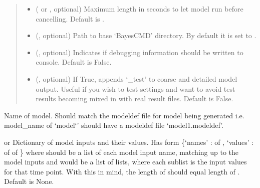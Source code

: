\documentclass[letterpaper,10pt,english]{sphinxmanual}
\begin{document}
\begin{fulllineitems}
\begin{quote}
\begin{description}
\begin{itemize}
\item {} 
 ( or , optional) \textendash{} Maximum length in seconds to let model run before cancelling. Default
is {\hyperref[\detokenize{bcmdModel:bayescmd.bcmdModel.bcmd_model.TIMEOUT}]{}}.

\item {} 
 (, optional) \textendash{} Path to base ‘BayesCMD’ directory. By default it is set to
{\hyperref[\detokenize{bcmdModel:bayescmd.bcmdModel.bcmd_model.BASEDIR}]{}}.

\item {} 
 (, optional) \textendash{} Indicates if debugging information should be written to console.
Default is False.

\item {} 
 (, optional) \textendash{} If True, appends ‘\_test’ to coarse and detailed model output. Useful
if you wish to test settings and want to avoid test results becoming
mixed in with real result files. Default is False.

\end{itemize}

\end{description}\end{quote}

\begin{fulllineitems}
\label{\detokenize{bcmdModel:bayescmd.bcmdModel.bcmd_model.ModelBCMD.model_name}}
 \textendash{} Name of model. Should match the modeldef file for model being generated
i.e. model\_name of ‘model{}`’ should have a modeldef file
‘model1.modeldef’.

\end{fulllineitems}


\begin{fulllineitems}
\label{\detokenize{bcmdModel:bayescmd.bcmdModel.bcmd_model.ModelBCMD.inputs}}
 or  \textendash{} Dictionary of model inputs and their values. Has form
\{‘names’ :  of ,
‘values’ :  of  of \}
where  should be a list of each model input name, matching up to
the model inputs and  would be a list of lists, where each
sublist is the input values for that time point. With this in mind,
the length of  should equal length of .
Default is None.


\end{fulllineitems}
\end{fulllineitems}
\end{document}
